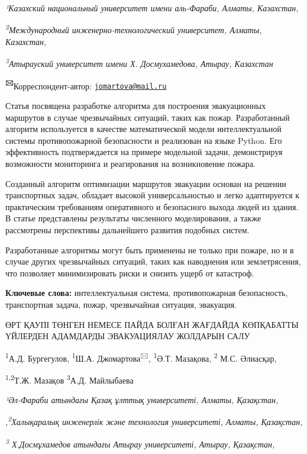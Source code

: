 \documentclass[
]{article}
\begin{document}
\emph{¹Казахский национальный университет имени аль-Фараби, Алматы,
Казахстан,}

\emph{\textsuperscript{2}Международный инженерно-технологический
университет, Алматы, Казахстан,}

\emph{\textsuperscript{3}Атырауский университет имени Х. Досмухамедова,
Атырау, Казахстан}

\textbf{\textsuperscript{🖂}}Корреспондент-автор:
\href{mailto:jomartova@mail.ru}{\nolinkurl{jomartova@mail.ru}}

Статья посвящена разработке алгоритма для построения эвакуационных
маршрутов в случае чрезвычайных ситуаций, таких как пожар. Разработанный
алгоритм используется в качестве математической модели интеллектуальной
системы противопожарной безопасности и реализован на языке Python. Его
эффективность подтверждается на примере модельной задачи, демонстрируя
возможности мониторинга и реагирования на возникновение пожара.

Созданный алгоритм оптимизации маршрутов эвакуации основан на решении
транспортных задач, обладает высокой универсальностью и легко
адаптируется к практическим требованиям оперативного и безопасного
выхода людей из здания. В статье представлены результаты численного
моделирования, а также рассмотрены перспективы дальнейшего развития
подобных систем.

Разработанные алгоритмы могут быть применены не только при пожаре, но и
в случае других чрезвычайных ситуаций, таких как наводнения или
землетрясения, что позволяет минимизировать риски и снизить ущерб от
катастроф.

\textbf{Ключевые слова:} интеллектуальная система, противопожарная
безопасность, транспортная задача, пожар, чрезвычайная ситуация,
эвакуация.

ӨРТ ҚАУПІ ТӨНГЕН НЕМЕСЕ ПАЙДА БОЛҒАН ЖАҒДАЙДА КӨПҚАБАТТЫ ҮЙЛЕРДЕН
АДАМДАРДЫ ЭВАКУАЦИЯЛАУ ЖОЛДАРЫН САЛУ

\textsuperscript{1}А.Д. Бургегулов, \textsuperscript{1}Ш.А.
Джомартова\textsuperscript{🖂}, \textsuperscript{1}Ә.Т. Мазақова,
\textsuperscript{2} М.С. Әлиасқар,

\textsuperscript{1,2}Т.Ж. Мазақов \textsuperscript{3}А.Д. Майлыбаева

\emph{¹Әл-Фараби атындағы Қазақ ұлттық университеті, Алматы, Қазақстан,}

\emph{,\textsuperscript{2}Халықаралық инженерлік және технология
университеті, Алматы, Қазақстан,}

\emph{\textsuperscript{3} Х.Досмұхамедов атындағы Атырау университеті,
Атырау, Қазақстан,}
\end{document}
